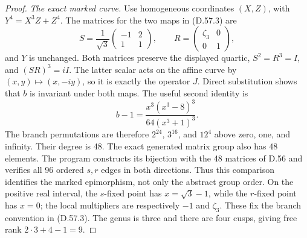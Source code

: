 \begin{proof}
\emph{The exact marked curve.}
Use homogeneous coordinates \((X,Z)\), with
\(Y^4=X^3Z+Z^4\). The matrices for the two maps in
(D.57.3) are
\[
 S=\frac1{\sqrt3}
     \begin{pmatrix}-1&2\\1&1\end{pmatrix},
 \qquad R=\begin{pmatrix}\zeta_3&0\\0&1\end{pmatrix},
 \tag{D.57.10}
\]
and \(Y\) is unchanged. Both matrices preserve the displayed
quartic, \(S^2=R^3=I\), and \((SR)^3=iI\).
The latter scalar acts on the affine curve by
\((x,y)\mapsto(x,-iy)\), so it is exactly the operator \(J\).
Direct substitution shows that \(b\) is invariant under
both maps. The useful second identity is
\[
 b-1=\frac{x^3(x^3-8)^3}{64(x^3+1)^3}.
 \tag{D.57.11}
\]
The branch permutations are therefore \(2^{24}\),
\(3^{16}\), and \(12^4\) above zero, one, and infinity.
Their degree is 48. The exact generated matrix group also
has 48 elements. The program constructs its bijection with
the 48 matrices of D.56 and verifies all 96 ordered
\(s,r\) edges in both directions. Thus this comparison
identifies the marked epimorphism, not only the abstract
group order. On the positive real interval, the \(s\)-fixed
point has \(x=\sqrt3-1\), while the \(r\)-fixed point has
\(x=0\); the local multipliers are respectively \(-1\)
and \(\zeta_3\). These fix the branch convention in (D.57.3).
The genus is three and there are four cusps, giving free
rank \(2\cdot3+4-1=9\).


\end{proof}
